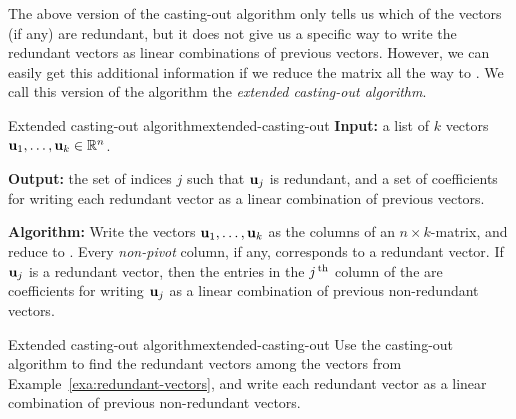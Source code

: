 The above version of the casting-out algorithm only tells us which of
the vectors (if any) are redundant, but it does not give us a specific
way to write the redundant vectors as linear combinations of previous
vectors. However, we can easily get this additional information if we
reduce the matrix all the way to {\rref}. We call this version of the
algorithm the {\em extended casting-out algorithm}.

\begin{algorithm}{Extended casting-out algorithm}{extended-casting-out}
  \textbf{Input:} a list of $k$ vectors
  $\mbox{\bf u}_1,\ldots,\mbox{\bf u}_k\in\mathbb{R}^n$.
  \smallskip

  \textbf{Output:} the set of indices $j$ such that $\mbox{\bf u}_j$ is
  redundant, and a set of coefficients for writing each redundant
  vector as a linear combination of previous vectors.
  \smallskip
  
  \textbf{Algorithm:} Write the vectors $\mbox{\bf u}_1,\ldots,\mbox{\bf u}_k$
  as the columns of an $n\times k$-matrix, and reduce to
  {\rref}. Every {\em non-pivot} column, if any, corresponds to a
  redundant vector. If $\mbox{\bf u}_j$ is a redundant vector, then the
  entries in the $j^{\,\rm th}$ column of the {\rref} are coefficients for
  writing $\mbox{\bf u}_j$ as a linear combination of previous
  non-redundant vectors.
\end{algorithm}

\begin{example}{Extended casting-out algorithm}{extended-casting-out}
  Use the casting-out algorithm to find the redundant vectors among
  the vectors from Example~\ref{exa:redundant-vectors}, and write each
  redundant vector as a linear combination of previous non-redundant
  vectors.
\end{example}

